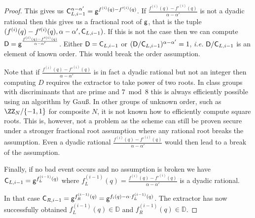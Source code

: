 \documentclass{article}
\theoremstyle{definition}
\begin{document}
\begin{proof}
 This gives us $\mathsf{C}_{L,i-1}^{\alpha-\alpha'}=\mathsf{g}^{f^{(i)}(q)-f'^{(i)}(q)}$. 
 If $\frac{f^{(i)}(q)-f'^{(i)}(q)}{\alpha-\alpha'}$ is not a dyadic rational then this gives us a fractional root of $\mathsf{g}$, that is the tuple $(f^{(i)}(q)-f'^{(i)}(q),\alpha-\alpha',\mathsf{C}_{L,i-1})$. If this is not the case then we can compute $\mathsf{D}=\mathsf{g}^{\frac{f^{(i)}(q)-f'^{(i)}(q)}{\alpha-\alpha'}}$. Either $\mathsf{D}=\mathsf{C}_{L,i-1}$ or $(\mathsf{D}/\mathsf{C}_{L,i-1})^{\alpha-\alpha'}=1$, \emph{i.e.} $\mathsf{D}/\mathsf{C}_{L,i-1}$ is an element of known order. This would break the order assumption.
 
Note that if $\frac{f^{(i)}(q)-f'^{(i)}(q)}{\alpha-\alpha'}$ is in fact a dyadic rational but not an integer then computing $D$ requires the extractor to take power of two roots. In class groups with discriminants that are prime and $7 \bmod 8$ this is always efficiently possible using an algorithm by Gauß\cite{bosma1996computation}. In other groups of unknown order, such as $\ZZ_N/\{-1,1\}$ for composite $N$, it is not known how to efficiently compute square roots. This is, however, not a problem as the scheme can still be proven secure under a stronger fractional root assumption where any rational root breaks the assumption. Even a dyadic rational $\frac{f^{(i)}(q)-f'^{(i)}(q)}{\alpha-\alpha'}$ would then lead to a break of the assumption.

Finally, if no bad event occurs and no assumption is broken we have $\mathsf{C}_{L,i-1}=\mathsf{g}^{f^{(i-1)}_L(q)}$ where $f^{(i-1)}_L(q)=\frac{f^{(i)}(q)-f'^{(i)}(q)}{\alpha-\alpha'}$ is a dyadic rational.  
 
 In that case $\mathsf{C}_{R,i-1}=\mathsf{g}^{f^{(i-1)}_R(q)}=\mathsf{g}^{f_{i}(q)-\alpha \cdot f^{(i-1)}_L(q)}$. The extractor has now successfully obtained $f^{(i-1)}_L(q)\in \mathbb{D}$ and $f^{(i-1)}_R(q)\in \mathbb{D}$.
 

\end{proof}
\end{document}
